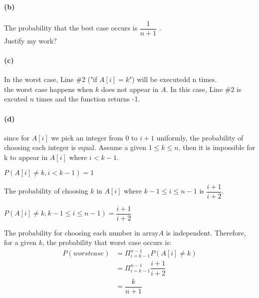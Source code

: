\documentclass[11pt]{csc_assignment}
\begin{document}
\begin{description}
\paragraph{(b)}
The probability that the best case occurs is $ \dfrac{1}{n+1} $ .\\
Justify my work?
\paragraph{(c)}
In the worst case, Line \#2 ("if $ A[i]=k $") will be executedd n times.\\
the worst case happens when $ k $ does not appear in $ A $. In this case, Line \#2 is excuted $ n $ times and the function returns -1.\\
\paragraph{(d)}
since for $ A[i] $ we pick an integer from 0 to $ i+1 $ uniformly, the probability of choosing each integer is equal. Assume a given $ 1 \leq k \leq n $,  then it is impossible for k to appear in $ A[i] $ where $ i < k-1 $.\\
\begin{center}
	$ P(A[i]\neq k ,i<k-1)=1 $
\end{center} 
The probability of choosing $ k $ in $ A[i] $ where $ k-1\leq i\leq n-1 $ is $ \dfrac{i+1}{i+2} $.\\
\begin{center}
	$ P(A[i]\neq k , k-1\leq i\leq n-1)=\dfrac{i+1}{i+2} $
\end{center} 
The probability for choosing each number in array$ A $ is independent. Therefore, for a given $ k $, the probability that worst case occurs is:
\begin{align*}
	P(worst case) & = \Pi^{n-1}_{i=k-1} P(A[i]\neq k)\\
	 &=  \Pi^{n-1}_{i=k-1} \dfrac{i+1}{i+2}\\
	 &= \dfrac{k}{n+1} 
\end{align*} 

\end{description}
\end{document}
